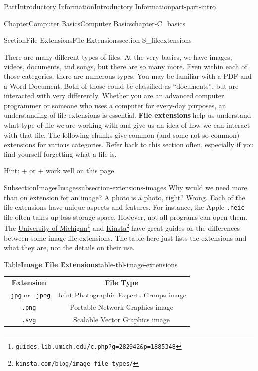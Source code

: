 \documentclass[oneside,10pt,]{book}
\newcommand{\tabularfont}{\relax}
\newcommand{\mono}[1]{\texttt{#1}}
\newcommand{\terminology}[1]{\textbf{#1}}
\newcommand{\kbd}[1]{\keys{{#1}}}
\begin{document}
\begin{partptx}{Part}{Introductory Information}{}{Introductory Information}{}{}{part-part-intro}
\begin{chapterptx}{Chapter}{Computer Basics}{}{Computer Basics}{}{}{chapter-C_basics}
\begin{sectionptx}{Section}{File Extensions}{}{File Extensions}{}{}{section-S_fileextensions}
\begin{introduction}{}
There are many different types of files. At the very basics, we have images, videos, documents, and songs, but there are so many more. Even within each of those categories, there are numerous types. You may be familiar with a PDF and a Word Document. Both of those could be classified as ``documents'', but are interacted with very differently. Whether you are an advanced computer programmer or someone who uses a computer for every-day purposes, an understanding of file extensions is essential. \terminology{File extensions} help us understand what type of file we are working with and give us an idea of how we can interact with that file. The following chunks give common (and some not so common) extensions for various categories. Refer back to this section often, especially if you find yourself forgetting what a file is.%
\par
Hint: \kbd{Control} + \kbd{F} or \kbd{Command} + \kbd{F} work well on this page.%
\end{introduction}%
%
%
\typeout{************************************************}
\typeout{************************************************}
%
\begin{subsectionptx}{Subsection}{Images}{}{Images}{}{}{subsection-extensions-images}
%
Why would we need more than on extension for an image? A photo is a photo, right? Wrong. Each of the file extensions have unique aspects and features. For instance, the Apple \mono{.heic} file often takes up less storage space. However, not all programs can open them. The \href{https://guides.lib.umich.edu/c.php?g=282942\&p=1885348}{University of Michigan}\footnote{\nolinkurl{guides.lib.umich.edu/c.php?g=282942\&p=1885348}\label{fn-extensions-images-c-c}} and \href{https://kinsta.com/blog/image-file-types/}{Kinsta}\footnote{\nolinkurl{kinsta.com/blog/image-file-types/}\label{fn-extensions-images-c-e}} have great guides on the differences between some image file extensions. The table here just lists the extensions and what they are, not the details on their use.%
\begin{tableptx}{Table}{\textbf{Image File Extensions}}{table-tbl-image-extensions}{}%
\centering%
{\tabularfont%
\begin{tabular}{cc}
{\bfseries{}Extension}&{\bfseries{}File Type}\tabularnewline[0pt]
\mono{.jpg} or \mono{.jpeg}&Joint Photographic Experts Groups image\tabularnewline[0pt]
\mono{.png}&Portable Network Graphics image\tabularnewline[0pt]
\mono{.svg}&Scalable Vector Graphics image\tabularnewline[0pt]

\end{tabular}}
\end{tableptx}
\end{subsectionptx}
\end{sectionptx}
\end{chapterptx}
\end{partptx}
\end{document}
